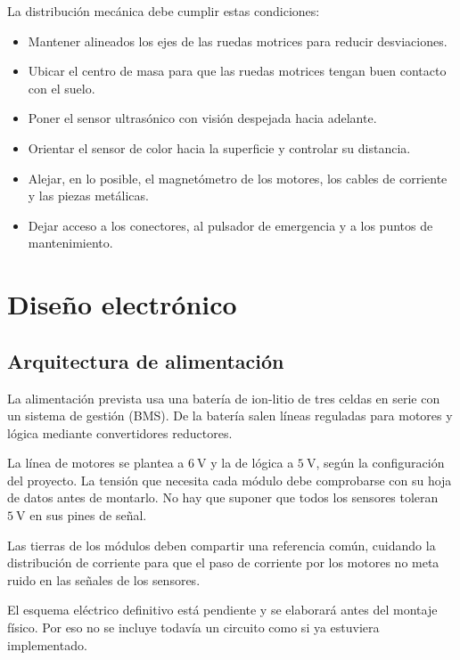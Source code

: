 \documentclass[journal]{IEEEtran}
\begin{document}
La distribución mecánica debe cumplir estas condiciones:

\begin{itemize}
    \item Mantener alineados los ejes de las ruedas motrices para reducir desviaciones.
    \item Ubicar el centro de masa para que las ruedas motrices tengan buen contacto con el suelo.
    \item Poner el sensor ultrasónico con visión despejada hacia adelante.
    \item Orientar el sensor de color hacia la superficie y controlar su distancia.
    \item Alejar, en lo posible, el magnetómetro de los motores, los cables de corriente y las piezas metálicas.
    \item Dejar acceso a los conectores, al pulsador de emergencia y a los puntos de mantenimiento.
\end{itemize}


\section{Diseño electrónico}

\subsection{Arquitectura de alimentación}

La alimentación prevista usa una batería de ion-litio de tres celdas en serie con un sistema de gestión (BMS). De la batería salen líneas reguladas para motores y lógica mediante convertidores reductores.

La línea de motores se plantea a $6~\mathrm{V}$ y la de lógica a $5~\mathrm{V}$, según la configuración del proyecto. La tensión que necesita cada módulo debe comprobarse con su hoja de datos antes de montarlo. No hay que suponer que todos los sensores toleran $5~\mathrm{V}$ en sus pines de señal.

Las tierras de los módulos deben compartir una referencia común, cuidando la distribución de corriente para que el paso de corriente por los motores no meta ruido en las señales de los sensores.

El esquema eléctrico definitivo está pendiente y se elaborará antes del montaje físico. Por eso no se incluye todavía un circuito como si ya estuviera implementado.
\end{document}
